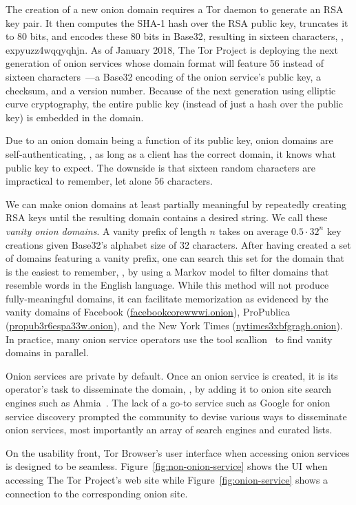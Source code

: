 The creation of a new onion domain requires a Tor daemon to generate an RSA key
pair.  It then computes the SHA-1 hash over the RSA public key, truncates it to
80 bits, and encodes these 80 bits in Base32, resulting in sixteen characters,
\eg, expyuzz4wqqyqhjn.  As of January 2018, The Tor Project is deploying the
next generation of onion services whose domain format will feature 56 instead of
sixteen characters~\cite[\S~6]{Mathewson2013a}---a Base32 encoding of the onion
service's public key, a checksum, and a version number.  Because of the next
generation using elliptic curve cryptography, the entire public key (instead of
just a hash over the public key) is embedded in the domain.

Due to an onion domain being a function of its public key, onion domains are
self-authenticating, \ie, as long as a client has the correct domain, it knows
what public key to expect.  The downside is that sixteen random characters are
impractical to remember, let alone 56 characters.

We can make onion domains at least partially meaningful by repeatedly creating
RSA keys until the resulting domain contains a desired string.  We call these
\emph{vanity onion domains}.  A vanity prefix of length $n$ takes on average
$0.5 \cdot 32^n$ key creations given Base32's alphabet size of 32 characters.
After having created a set of domains featuring a vanity prefix, one can search
this set for the domain that is the easiest to remember, \eg, by using a Markov
model to filter domains that resemble words in the English language.  While this
method will not produce fully-meaningful domains, it can facilitate memorization
as evidenced by the vanity domains of Facebook
(\href{https://www.facebookcorewwwi.onion}{facebookcorewwwi.onion}),
ProPublica
(\href{https://www.propub3r6espa33w.onion}{propub3r6espa33w.onion}),
and the New York Times
(\href{https://www.nytimes3xbfgragh.onion}{nytimes3xbfgragh.onion}).  In
practice, many onion service operators use the tool scallion~\cite{scallion} to
find vanity domains in parallel.

Onion services are private by default.  Once an onion service is created, it is
its operator's task to disseminate the domain, \eg, by adding it to onion site
search engines such as Ahmia~\cite{ahmia}.  The lack of a go-to service such as
Google for onion service discovery prompted the community to devise various ways
to disseminate onion services, most importantly an array of search engines and
curated lists.

On the usability front, Tor Browser's user interface when accessing onion
services is designed to be seamless.  Figure~\ref{fig:non-onion-service} shows
the UI when accessing The Tor Project's web site while
Figure~\ref{fig:onion-service} shows a connection to the corresponding onion
site.

